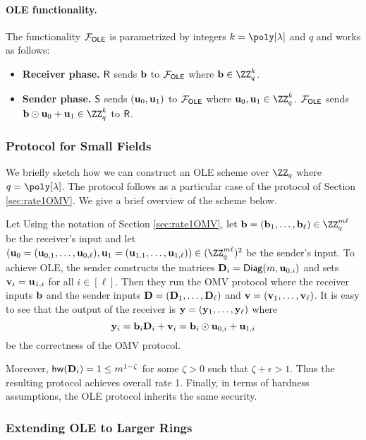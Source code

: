 \paragraph{OLE functionality.}  The functionality $\mathcal{F}_{\mathsf{OLE}}$ is parametrized by integers $k=\poly[\lambda]$ and $q$ and works as follows:
\begin{itemize}
    \item \textbf{Receiver phase.} $\mathsf{R}$ sends $\mathbf{b}$ to  $\mathcal{F}_{\mathsf{OLE}}$ where $\bn\in\ZZ_q^k$. 

  \item \textbf{Sender phase.}
      $\mathsf{S}$ sends $(\mathbf{u}_0,\mathbf{u}_1)$ to $\mathcal{F}_{\mathsf{OLE}}$ where $\un_0,\un_1\in\ZZ_q^{k}$. $\mathcal{F}_{\mathsf{OLE}}$ sends $\bn\odot\un_0 + \un_1\in\ZZ_q^k$ to $\mathsf{R}$. 
\end{itemize}


\subsubsection{Protocol for Small Fields}
We briefly sketch how we can construct an OLE scheme over $\ZZ_q$ where $q=\poly[\lambda]$. The protocol follows as a particular case of the protocol of Section \ref{sec:rate1OMV}. We give a brief overview of the scheme below.

Let Using the notation of Section \ref{sec:rate1OMV}, let $\bn=(\bn_1,\dots, \bn_\ell)\in\ZZ_q^{m\ell}$ be the receiver's input and let $(\un_0=(\un_{0,1},\dots, \un_{0,\ell}),\un_1=(\un_{1,1},\dots, \un_{1,\ell})) \in(\ZZ_q^{m\ell})^2$ be the sender's input. To achieve OLE, the sender constructs the matrices $\mathbf{D}_i=\mathsf{Diag}(m,\mathbf{u}_{0,i})$ and sets $\mathbf{v}_i=\mathbf{u}_{1,i}$ for all $i\in [\ell]$. Then they run the OMV protocol where the receiver inputs $\mathbf{b}$ and the sender inputs $\mathbf{D}=(\mathbf{D}_1,\dots ,\mathbf{D}_\ell)$ and $\mathbf{v}=(\mathbf{v}_1,\dots, \mathbf{v}_\ell)$. It is easy to see that the output of the receiver is $\mathbf{y}=(\mathbf{y}_1,\dots, \mathbf{y}_\ell)$ where $$\mathbf{y}_i=\mathbf{b}_i\mathbf{D}_i+\mathbf{v}_i= \mathbf{b}_i\odot \mathbf{u}_{0,i}+\mathbf{u}_{1,i}$$ be the correctness of the OMV protocol. 

Moreover, $\mathsf{hw}(\mathbf{D}_i)=1\leq m^{1-\zeta}$ for some $\zeta>0$ such that $\zeta + \epsilon>1$. Thus the  resulting protocol achieves overall rate 1. Finally, in terms of hardness assumptions, the OLE protocol inherits the same security.


\subsubsection{Extending OLE to Larger Rings}

